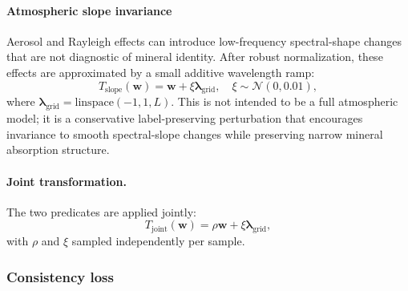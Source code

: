 \documentclass[preprint,12pt]{elsarticle}
\begin{document}
\paragraph{Atmospheric slope invariance}
Aerosol and Rayleigh effects can introduce low-frequency spectral-shape changes that are not diagnostic of mineral identity.
After robust normalization, these effects are approximated by a small additive wavelength ramp:
\begin{equation}
T_{\text{slope}}(\mathbf{w}) = \mathbf{w} + \xi \boldsymbol{\lambda}_{\text{grid}}, \quad \xi \sim \mathcal{N}(0, 0.01),
\label{eq:slope_predicate}
\end{equation}
where $\boldsymbol{\lambda}_{\text{grid}} = \mathrm{linspace}(-1, 1, L)$.
This is not intended to be a full atmospheric model; it is a conservative label-preserving perturbation that encourages invariance to smooth spectral-slope changes while preserving narrow mineral absorption structure.

\paragraph{Joint transformation.}
The two predicates are applied jointly:
\begin{equation}
T_{\text{joint}}(\mathbf{w}) = \rho \mathbf{w} + \xi \boldsymbol{\lambda}_{\text{grid}},
\label{eq:joint_transform}
\end{equation}
with $\rho$ and $\xi$ sampled independently per sample.

\subsubsection{Consistency loss}
\label{sec:lusi_loss}
\end{document}
